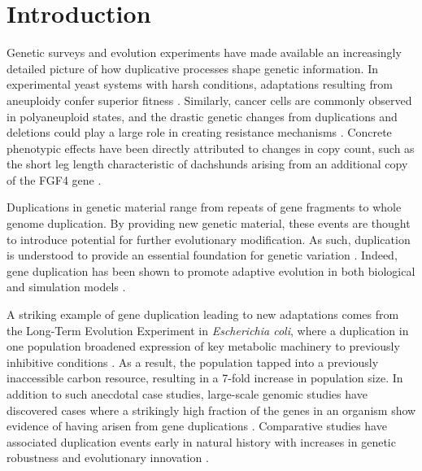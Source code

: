 \section{Introduction} \label{sec:introduction}

Genetic surveys and evolution experiments have made available an increasingly detailed picture of how duplicative processes shape genetic information.
In experimental yeast systems with harsh conditions, adaptations resulting from aneuploidy confer superior fitness \citep{Pavelka:2010}.
Similarly, cancer cells are commonly observed in polyaneuploid states, and the drastic genetic changes from duplications and deletions could play a large role in creating resistance mechanisms \citep{polyaneuploidCancer}.
Concrete phenotypic effects have been directly attributed to changes in copy count, such as the short leg length characteristic of dachshunds arising from an additional copy of the FGF4 gene \citep{dachshundGeneCopyNum}.

Duplications in genetic material range from repeats of gene fragments to whole genome duplication.
By providing new genetic material, these events are thought to introduce potential for further evolutionary modification.
As such, duplication is understood to provide an essential foundation for genetic variation \citep{Zhang:2003fw,Crow:2006role,Magadum:2013wu}.
Indeed, gene duplication has been shown to promote adaptive evolution in both biological and simulation models \citep{Hu:2010ea}.

A striking example of gene duplication leading to new adaptations
comes from the Long-Term Evolution Experiment in \textit{Escherichia coli}, where a duplication in one population broadened expression of key metabolic machinery to previously inhibitive conditions \citep{blount_genomic_2012}.
As a result, the population tapped into a previously inaccessible carbon resource, resulting in a 7-fold increase in population size.
In addition to such anecdotal case studies, large-scale genomic studies have discovered cases where a strikingly high fraction of the genes in an organism show evidence of having arisen from gene duplications \citep{teichmann_structural_1998,Teichmann:2004cz}.
Comparative studies have associated duplication events early in natural history with increases in genetic robustness and evolutionary innovation \citep{wagner_gene_2008}.

